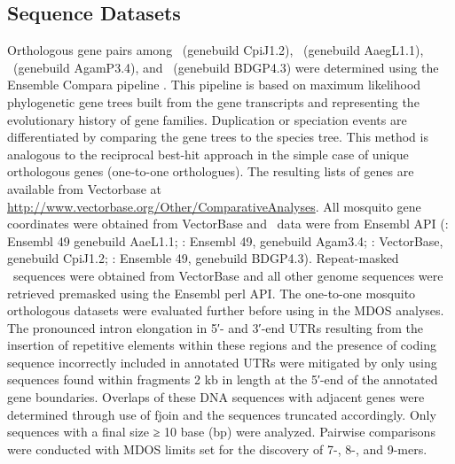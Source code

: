 \subsection{Sequence Datasets}
Orthologous gene pairs among \Cxq\ (genebuild CpiJ1.2), \Aea\ (genebuild AaegL1.1), \Ang\ (genebuild AgamP3.4), and \Dmel\ (genebuild BDGP4.3) were determined using the Ensemble Compara pipeline \cite{Vilella2009}.
This pipeline is based on maximum likelihood phylogenetic gene trees built from the gene transcripts and representing the evolutionary history of gene families.
Duplication or speciation events are differentiated by comparing the gene trees to the species tree.
This method is analogous to the reciprocal best-hit approach in the simple case of unique orthologous genes (one-to-one orthologues).
The resulting lists of genes are available from Vectorbase at \url{http://www.vectorbase.org/Other/ComparativeAnalyses}.
All mosquito gene coordinates were obtained from VectorBase and \Dm\ data were from Ensembl API (\Aa: Ensembl 49 genebuild AaeL1.1; \Ag: Ensembl 49, genebuild Agam3.4; \Cq: VectorBase, genebuild CpiJ1.2; \Dm: Ensemble 49, genebuild BDGP4.3).
Repeat-masked \Cq\ sequences were obtained from VectorBase and all other genome sequences were retrieved premasked using the Ensembl perl API.
The one-to-one mosquito orthologous datasets were evaluated further before using in the MDOS analyses.
The pronounced intron elongation in 5′- and 3′-end UTRs resulting from the insertion of repetitive elements within these regions \cite{Nene2007} and the presence of coding sequence incorrectly included in annotated UTRs were mitigated by only using sequences found within fragments 2 kb in length at the 5′-end of the annotated gene boundaries.
Overlaps of these DNA sequences with adjacent genes were determined through use of fjoin \cite{Richardson2006} and the sequences truncated accordingly.
Only sequences with a final size ≥ 10 base (bp) were analyzed.
Pairwise comparisons were conducted with MDOS limits set for the discovery of 7-, 8-, and 9-mers.

